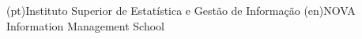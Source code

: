 



\ntdepartment(pt){Instituto Superior de Estatística e Gestão de Informação}
\ntdepartment(en){NOVA Information Management School}







